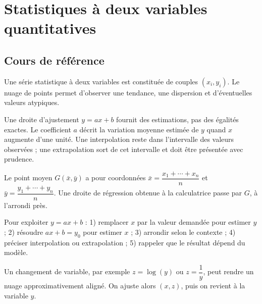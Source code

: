 
\chapter{Statistiques à deux variables quantitatives}
\section{Cours de référence}
Une série statistique à deux variables est constituée de couples $(x_i,y_i)$. Le nuage de points permet d'observer une tendance, une dispersion et d'éventuelles valeurs atypiques.

\begin{center}
\end{center}

\begin{retenir}
Une droite d'ajustement $y=ax+b$ fournit des estimations, pas des égalités exactes. Le coefficient $a$ décrit la variation moyenne estimée de $y$ quand $x$ augmente d'une unité. Une interpolation reste dans l'intervalle des valeurs observées ; une extrapolation sort de cet intervalle et doit être présentée avec prudence.
\end{retenir}

Le point moyen $G(\bar x,\bar y)$ a pour coordonnées $\bar x=\dfrac{x_1+\cdots+x_n}{n}$ et $\bar y=\dfrac{y_1+\cdots+y_n}{n}$. Une droite de régression obtenue à la calculatrice passe par $G$, à l'arrondi près.

\begin{methode}
Pour exploiter $y=ax+b$ : 1) remplacer $x$ par la valeur demandée pour estimer $y$ ; 2) résoudre $ax+b=y_0$ pour estimer $x$ ; 3) arrondir selon le contexte ; 4) préciser interpolation ou extrapolation ; 5) rappeler que le résultat dépend du modèle.
\end{methode}

Un changement de variable, par exemple $z=\log(y)$ ou $z=\dfrac1y$, peut rendre un nuage approximativement aligné. On ajuste alors $(x,z)$, puis on revient à la variable $y$.

